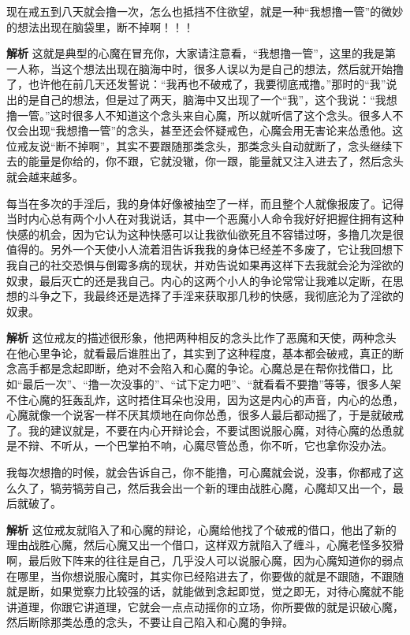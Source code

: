 \begin{case}
    现在戒五到八天就会撸一次，怎么也抵挡不住欲望，就是一种“我想撸一管”的微妙的想法出现在脑袋里，断不掉啊！！！

    \textbf{解析} 这就是典型的心魔在冒充你，大家请注意看，“我想撸一管”，这里的我是第一人称，当这个想法出现在脑海中时，很多人误以为是自己的想法，然后就开始撸了，也许他在前几天还发誓说：“我再也不破戒了，我要彻底戒撸。”那时的“我”说出的是自己的想法，但是过了两天，脑海中又出现了一个“我”，这个我说：“我想撸一管。”这时很多人不知道这个念头来自心魔，所以就听信了这个念头。很多人不仅会出现“我想撸一管”的念头，甚至还会怀疑戒色，心魔会用无害论来怂恿他。这位戒友说“断不掉啊”，其实不要跟随那类念头，那类念头自动就断了，念头继续下去的能量是你给的，你不跟，它就没辙，你一跟，能量就又注入进去了，然后念头就会越来越多。
\end{case}

\begin{case}[心魔会帮你找借口]
    每当在多次的手淫后，我的身体好像被抽空了一样，而且整个人就像报废了。记得当时内心总有两个小人在对我说话，其中一个恶魔小人命令我好好把握住拥有这种快感的机会，因为它认为这种快感可以让我欲仙欲死且不容错过呀，多撸几次是很值得的。另外一个天使小人流着泪告诉我我的身体已经差不多废了，它让我回想下我自己的社交恐惧与倒霉多病的现状，并劝告说如果再这样下去我就会沦为淫欲的奴隶，最后灭亡的还是我自己。内心的这两个小人的争论常常让我难以定断，在思想的斗争之下，我最终还是选择了手淫来获取那几秒的快感，我彻底沦为了淫欲的奴隶。

    \textbf{解析} 这位戒友的描述很形象，他把两种相反的念头比作了恶魔和天使，两种念头在他心里争论，就看最后谁胜出了，其实到了这种程度，基本都会破戒，真正的断念高手都是念起即断，绝对不会陷入和心魔的争论。心魔总是在帮你找借口，比如“最后一次”、“撸一次没事的”、“试下定力吧”、“就看看不要撸”等等，很多人架不住心魔的狂轰乱炸，这时捂住耳朵也没用，因为这是内心的声音，内心的怂恿，心魔就像一个说客一样不厌其烦地在向你怂恿，很多人最后都动摇了，于是就破戒了。我的建议就是，不要在内心开辩论会，不要试图说服心魔，对待心魔的怂恿就是不辩、不听从，一个巴掌拍不响，心魔尽管怂恿，你不听，它也拿你没办法。
\end{case}

\begin{case}[心魔会帮你找借口]
    我每次想撸的时候，就会告诉自己，你不能撸，可心魔就会说，没事，你都戒了这么久了，犒劳犒劳自己，然后我会出一个新的理由战胜心魔，心魔却又出一个，最后就破了。

    \textbf{解析} 这位戒友就陷入了和心魔的辩论，心魔给他找了个破戒的借口，他出了新的理由战胜心魔，然后心魔又出一个借口，这样双方就陷入了缠斗，心魔老怪多狡猾啊，最后败下阵来的往往是自己，几乎没人可以说服心魔，因为心魔知道你的弱点在哪里，当你想说服心魔时，其实你已经陷进去了，你要做的就是不跟随，不跟随就是断，如果觉察力比较强的话，就能做到念起即觉，觉之即无，对待心魔就不能讲道理，你跟它讲道理，它就会一点点动摇你的立场，你所要做的就是识破心魔，然后断除那类怂恿的念头，不要让自己陷入和心魔的争辩。
\end{case}

